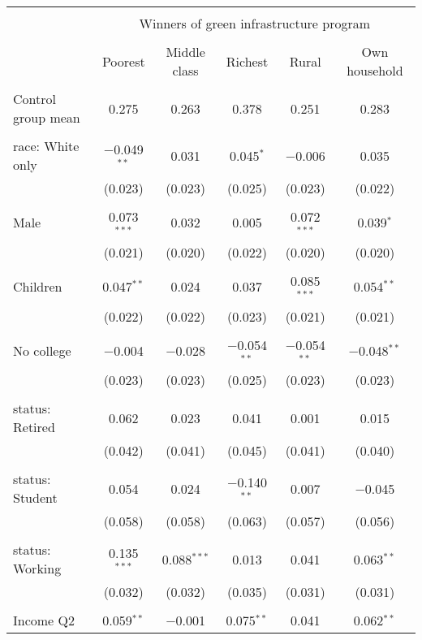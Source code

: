 
\begin{tabular}{@{\extracolsep{5pt}}lccccc} 
\\[-1.8ex]\hline 
\hline \\[-1.8ex] 
 & \multicolumn{5}{c}{Winners of green infrastructure program} \\ 
\cline{2-6} 
\\[-1.8ex] & Poorest & Middle class & Richest & Rural & Own household \\ 
\hline \\[-1.8ex] 
 Control group mean & 0.275 & 0.263 & 0.378 & 0.251 & 0.283  \\ \hline \\[-1.8ex] race: White only & $-$0.049$^{**}$ & 0.031 & 0.045$^{*}$ & $-$0.006 & 0.035 \\ 
  & (0.023) & (0.023) & (0.025) & (0.023) & (0.022) \\ 
  & & & & & \\ 
 Male & 0.073$^{***}$ & 0.032 & 0.005 & 0.072$^{***}$ & 0.039$^{*}$ \\ 
  & (0.021) & (0.020) & (0.022) & (0.020) & (0.020) \\ 
  & & & & & \\ 
 Children & 0.047$^{**}$ & 0.024 & 0.037 & 0.085$^{***}$ & 0.054$^{**}$ \\ 
  & (0.022) & (0.022) & (0.023) & (0.021) & (0.021) \\ 
  & & & & & \\ 
 No college & $-$0.004 & $-$0.028 & $-$0.054$^{**}$ & $-$0.054$^{**}$ & $-$0.048$^{**}$ \\ 
  & (0.023) & (0.023) & (0.025) & (0.023) & (0.023) \\ 
  & & & & & \\ 
 status: Retired & 0.062 & 0.023 & 0.041 & 0.001 & 0.015 \\ 
  & (0.042) & (0.041) & (0.045) & (0.041) & (0.040) \\ 
  & & & & & \\ 
 status: Student & 0.054 & 0.024 & $-$0.140$^{**}$ & 0.007 & $-$0.045 \\ 
  & (0.058) & (0.058) & (0.063) & (0.057) & (0.056) \\ 
  & & & & & \\ 
 status: Working & 0.135$^{***}$ & 0.088$^{***}$ & 0.013 & 0.041 & 0.063$^{**}$ \\ 
  & (0.032) & (0.032) & (0.035) & (0.031) & (0.031) \\ 
  & & & & & \\ 
 Income Q2 & 0.059$^{**}$ & $-$0.001 & 0.075$^{**}$ & 0.041 & 0.062$^{**}$ \\ 

\end{tabular}
